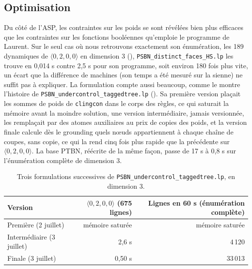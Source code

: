 \documentclass[12pt, a4paper]{article}
\begin{document}
\subsection{Optimisation}
\label{sec:optimisation}

Du côté de l'ASP, les contraintes sur les poids se sont révélées bien plus efficaces que les contraintes sur les fonctions booléennes qu'emploie le programme de Laurent.
Sur le seul cas où nous retrouvons exactement son énumération, les 189 dynamiques de $\langle 0,2,0,0\rangle$ en dimension 3 (), \texttt{PSBN\_distinct\_faces\_HS.lp} les trouve en 0,014 s contre 2,5 s pour son programme, soit environ 180 fois plus vite, un écart que la différence de machines (son temps a été mesuré sur la sienne) ne suffit pas à expliquer.
La formulation compte aussi beaucoup, comme le montre l'histoire de \texttt{PSBN\_undercontrol\_taggedtree.lp} ().
Sa première version plaçait les sommes de poids de \texttt{clingcon} dans le corps des règles, ce qui saturait la mémoire avant la moindre solution, une version intermédiaire, jamais versionnée, les remplaçait par des atomes auxiliaires au prix de copies des poids, et la version finale calcule dès le grounding quels nœuds appartiennent à chaque chaîne de coupes, sans copie, ce qui la rend cinq fois plus rapide que la précédente sur $\langle 0,2,0,0\rangle$.
La base PTBN, réécrite de la même façon, passe de 17 s à 0,8 s sur l'énumération complète de dimension 3.

\begin{table}[H]
\centering
\small
\caption{Trois formulations successives de \texttt{PSBN\_undercontrol\_taggedtree.lp}, en dimension 3.}
\label{tab:formulations}
\begin{tabular}{lrr}
\toprule
Version & $\langle 0,2,0,0\rangle$ (675 lignes) & Lignes en 60 s (énumération complète) \\
\midrule
Première (2 juillet) & mémoire saturée & mémoire saturée \\
Intermédiaire (3 juillet) & 2,6 s & 4\,120 \\
Finale (3 juillet) & 0,50 s & 33\,013 \\
\bottomrule
\end{tabular}
\end{table}
\end{document}
